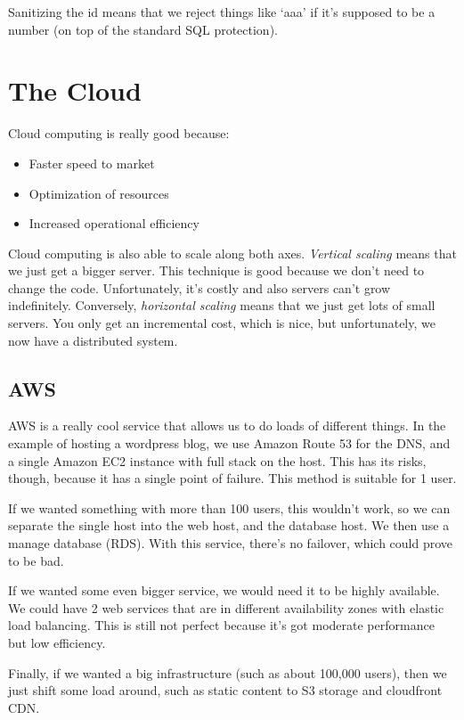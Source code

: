 \documentclass[11pt,a4paper,titlepage,dvipsnames,cmyk]{scrartcl}
\begin{document}
Sanitizing the id means that we reject things like `aaa' if it's supposed
to be a number (on top of the standard SQL protection).

\section{The Cloud}%
\label{sec:The Cloud}

Cloud computing is really good because:
\begin{itemize}
    \item Faster speed to market
    \item Optimization of resources
    \item Increased operational efficiency
\end{itemize}

Cloud computing is also able to scale along both axes. \textit{Vertical
scaling} means that we just get a bigger server. This technique is good
because we don't need to change the code. Unfortunately, it's costly and
also servers can't grow indefinitely. Conversely, \textit{horizontal
scaling} means that we just get lots of small servers. You only get an
incremental cost, which is nice, but unfortunately, we now have a
distributed system.

\subsection{AWS}%
\label{ssub:AWS}
AWS is a really cool service that allows us to do loads of different
things. In the example of hosting a wordpress blog, we use Amazon Route 53
for the DNS, and a single Amazon EC2 instance with full stack on the host.
This has its risks, though, because it has a single point of failure. This
method is suitable for 1 user.

If we wanted something with more than 100 users, this wouldn't work, so we
can separate the single host into the web host, and the database host. We
then use a manage database (RDS). With this service, there's no failover,
which could prove to be bad.

If we wanted some even bigger service, we would need it to be highly
available. We could have 2 web services that are in different availability
zones with elastic load balancing. This is still not perfect because it's
got moderate performance but low efficiency.

Finally, if we wanted a big infrastructure (such as about 100,000 users),
then we just shift some load around, such as static content to S3 storage
and cloudfront CDN.
\end{document}

